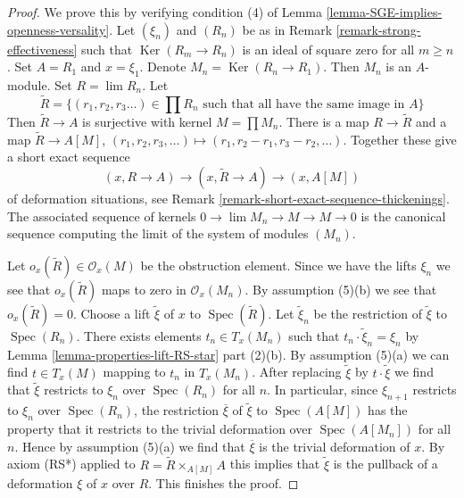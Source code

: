 \documentclass[10pt,a4paper]{amsart}
\theoremstyle{plain}
\theoremstyle{definition}
\theoremstyle{remark}
\numberwithin{equation}{subsection}
\def\lim{\mathop{\mathrm{lim}}\nolimits}
\def\Spec{\mathop{\mathrm{Spec}}}
\def\Ker{\mathop{\mathrm{Ker}}}
\begin{document}
\begin{proof}
We prove this by verifying condition (4) of
Lemma \ref{lemma-SGE-implies-openness-versality}.
Let $(\xi_n)$ and $(R_n)$ be as in Remark \ref{remark-strong-effectiveness}
such that $\Ker(R_m \to R_n)$ is an ideal of square zero
for all $m \geq n$. Set $A = R_1$ and $x = \xi_1$.
Denote $M_n = \Ker(R_n \to R_1)$.
Then $M_n$ is an $A$-module. Set $R = \lim R_n$.
Let
$$
\tilde R = \{(r_1, r_2, r_3 \ldots) \in \prod R_n
\text{ such that all have the same image in }A\}
$$
Then $\tilde R \to A$ is surjective with kernel $M = \prod M_n$.
There is a map $R \to \tilde R$ and a map
$\tilde R \to A[M]$, $(r_1, r_2, r_3, \ldots) \mapsto
(r_1, r_2 - r_1, r_3 - r_2, \ldots)$.
Together these give a short exact sequence
$$
(x, R \to A) \to (x, \tilde R \to A) \to (x, A[M])
$$
of deformation situations, see
Remark \ref{remark-short-exact-sequence-thickenings}.
The associated sequence of kernels
$0 \to \lim M_n \to M \to M \to 0$
is the canonical sequence computing the limit
of the system of modules $(M_n)$.

\medskip\noindent
Let $o_x(\tilde R) \in \mathcal{O}_x(M)$ be the obstruction element.
Since we have the lifts $\xi_n$ we see that $o_x(\tilde R)$
maps to zero in $\mathcal{O}_x(M_n)$. By assumption (5)(b)
we see that $o_x(\tilde R) = 0$. Choose a lift $\tilde \xi$
of $x$ to $\Spec(\tilde R)$. Let $\tilde \xi_n$ be the
restriction of $\tilde \xi$ to $\Spec(R_n)$. There exists
elements $t_n \in T_x(M_n)$ such that
$t_n \cdot \tilde \xi_n = \xi_n$ by
Lemma \ref{lemma-properties-lift-RS-star} part (2)(b).
By assumption (5)(a) we can find $t \in T_x(M)$
mapping to $t_n$ in $T_x(M_n)$. After replacing
$\tilde \xi$ by $t \cdot \tilde \xi$ we find that
$\tilde \xi$ restricts to $\xi_n$ over $\Spec(R_n)$ for all $n$.
In particular, since $\xi_{n + 1}$ restricts to $\xi_n$
over $\Spec(R_n)$, the restriction $\overline{\xi}$ of $\tilde \xi$
to $\Spec(A[M])$ has the property that it restricts to
the trivial deformation over $\Spec(A[M_n])$ for all $n$.
Hence by assumption (5)(a) we find that $\overline{\xi}$
is the trivial deformation of $x$. By axiom (RS*)
applied to $R = \tilde R \times_{A[M]} A$
this implies that $\tilde \xi$ is the pullback
of a deformation $\xi$ of $x$ over $R$. This finishes the proof.
\end{proof}
\end{document}
